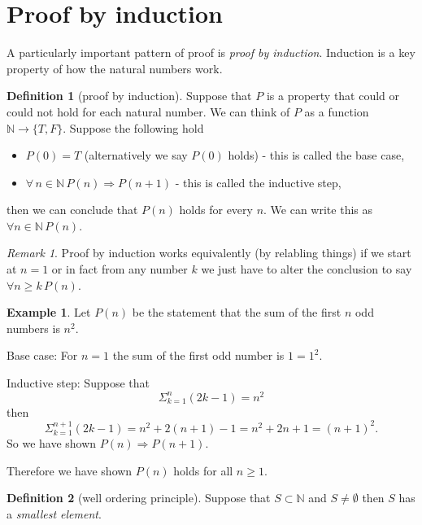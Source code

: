 \documentclass[
]{book}
\theoremstyle{definition}
\newtheorem{definition}{Definition}[chapter]
\theoremstyle{definition}
\newtheorem{example}{Example}[chapter]
\theoremstyle{definition}
\theoremstyle{definition}
\theoremstyle{remark}
\newtheorem*{remark}{Remark}
\begin{document}
\section{Proof by induction}\label{proof-by-induction}

A particularly important pattern of proof is \emph{proof by induction}. Induction is a key property of how the natural numbers work.

\begin{definition}[proof by induction]
Suppose that \(P\) is a property that could or could not hold for each natural number. We can think of \(P\) as a function \(\mathbb{N}\rightarrow \{T,F\}\). Suppose the following hold

\begin{itemize}
\item
  \(P(0)=T\) (alternatively we say \(P(0)\) holds) - this is called the base case,
\item
  \(\forall \, n \in \mathbb{N} \, P(n) \Rightarrow P(n+1)\) - this is called the inductive step,
\end{itemize}

then we can conclude that \(P(n)\) holds for every \(n\). We can write this as \(\forall n \in \mathbb{N} \, P(n)\).
\end{definition}

\begin{remark}
Proof by induction works equivalently (by relabling things) if we start at \(n=1\) or in fact from any number \(k\) we just have to alter the conclusion to say \(\forall n \geq k \, P(n)\).
\end{remark}

\begin{example}
Let \(P(n)\) be the statement that the sum of the first \(n\) odd numbers is \(n^2\).

Base case: For \(n=1\) the sum of the first odd number is \(1 = 1^2\).

Inductive step: Suppose that \[ \Sigma_{k=1}^n (2k-1) = n^2 \] then
\[ \Sigma_{k=1}^{n+1} (2k-1) = n^2 + 2(n+1) -1 = n^2 +2n +1 = (n+1)^2.  \] So we have shown \(P(n) \Rightarrow P(n+1)\).

Therefore we have shown \(P(n)\) holds for all \(n \geq 1\).
\end{example}

\begin{definition}[well ordering principle]
Suppose that \(S \subset \mathbb{N}\) and \(S \neq \emptyset\) then \(S\) has a \emph{smallest element}.
\end{definition}
\end{document}

